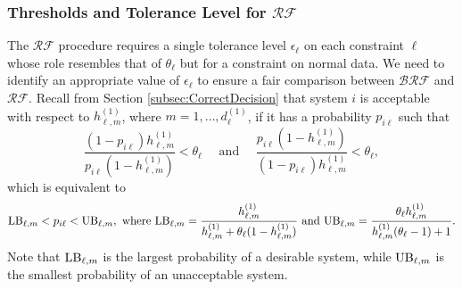 \documentclass[11pt]{article}
\begin{document}
\subsubsection{Thresholds and Tolerance Level for $\mathcal{RF}$}
\label{sec:Thresholds_CompareRF}

The $\mathcal{RF}$ procedure requires a single tolerance level $\epsilon_\ell$ on each constraint $\ell$ whose role resembles that of $\theta_\ell$ but for a constraint on normal data. We need to identify an appropriate value of $\epsilon_\ell$ to ensure a fair comparison between $\mathcal{BRF}$ and $\mathcal{RF}$. Recall from Section \ref{subsec:CorrectDecision} that system $i$ is acceptable with respect to  $h_{\ell,m}^{(1)}$, where $m=1,\ldots,d_\ell^{(1)}$, if it has a probability $p_{i\ell}$ such that 
\begin{equation*}
    \frac{(1-p_{i\ell})h_{\ell,m}^{(1)}}{p_{i\ell} (1-h_{\ell,m}^{(1)})}<\theta_\ell \quad \text{ and } \quad \frac{p_{i\ell}(1-h_{\ell,m}^{(1)})}{(1-p_{i\ell})h_{\ell,m}^{(1)}}<\theta_\ell, 
\end{equation*}
which is equivalent to 
\begin{equation*}
    {\rm LB}_{\ell, m} <p_{i\ell}<{\rm UB}_{\ell, m}, \text{ where } {\rm LB}_{\ell, m} = \frac{h_{\ell,m}^{(1)}}{h_{\ell,m}^{(1)}+\theta_\ell(1-h_{\ell,m}^{(1)})} \text{ and } {\rm UB}_{\ell, m} = \frac{\theta_\ell h_{\ell,m}^{(1)}}{h_{\ell,m}^{(1)}(\theta_\ell-1)+1}.
    \label{eqn:BeRF_AcceptableRegion}
\end{equation*}
Note that ${\rm LB}_{\ell, m}$ is the largest probability of a desirable system, while ${\rm UB}_{\ell, m}$ is the smallest probability of an unacceptable system.
\end{document}

